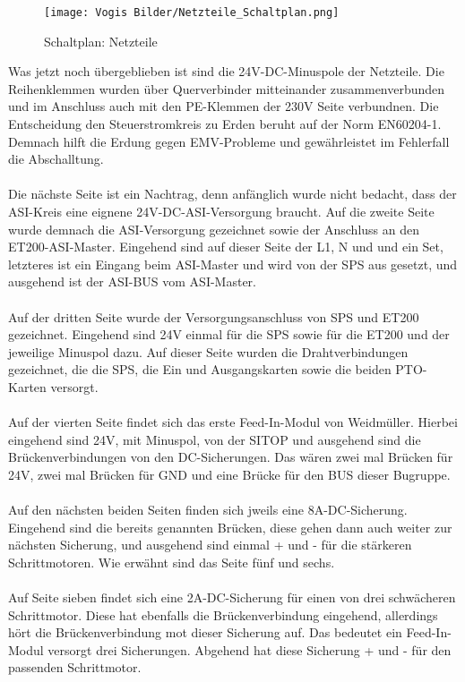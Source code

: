     \begin{figure}[h]
        \centering
        \texttt{[image: Vogis Bilder/Netzteile\_Schaltplan.png]}
        \caption{Schaltplan: Netzteile}
        \label{fig:Netzteile}
    \end{figure}Was jetzt noch übergeblieben ist sind die 24V-DC-Minuspole der Netzteile. Die Reihenklemmen wurden über Querverbinder mitteinander zusammenverbunden und im Anschluss auch mit den PE-Klemmen der 230V Seite verbundnen. Die Entscheidung den Steuerstromkreis zu Erden beruht auf der Norm EN60204-1. Demnach hilft die Erdung gegen EMV-Probleme und gewährleistet im Fehlerfall die Abschalltung. \cite{elektronet_steuerstromkreis_geerdet}\cite{beckhoff_steuerstromkreis_geerdet}\\\\
    Die nächste Seite ist ein Nachtrag, denn anfänglich wurde nicht bedacht, dass der ASI-Kreis eine eignene 24V-DC-ASI-Versorgung braucht. Auf die zweite Seite wurde demnach die ASI-Versorgung gezeichnet sowie der Anschluss an den ET200-ASI-Master. Eingehend sind auf dieser Seite der L1, N und und ein Set, letzteres ist ein Eingang beim ASI-Master und wird von der SPS aus gesetzt, und ausgehend ist der ASI-BUS vom ASI-Master.\\\\
    Auf der dritten Seite wurde der Versorgungsanschluss von SPS und ET200 gezeichnet. Eingehend sind 24V einmal für die SPS sowie für die ET200 und der jeweilige Minuspol dazu. Auf dieser Seite wurden die Drahtverbindungen gezeichnet, die die SPS, die Ein und Ausgangskarten sowie die beiden PTO-Karten versorgt.\\\\
    Auf der vierten Seite findet sich das erste Feed-In-Modul von Weidmüller. Hierbei eingehend sind 24V, mit Minuspol, von der SITOP und ausgehend sind die Brückenverbindungen von den DC-Sicherungen. Das wären zwei mal Brücken für 24V, zwei mal Brücken für GND und eine Brücke für den BUS dieser Bugruppe.\\\\
    Auf den nächsten beiden Seiten finden sich jweils eine 8A-DC-Sicherung. Eingehend sind die bereits genannten Brücken, diese gehen dann auch weiter zur nächsten Sicherung, und ausgehend sind einmal + und - für die stärkeren Schrittmotoren. Wie erwähnt sind das Seite fünf und sechs.\\\\
    Auf Seite sieben findet sich eine 2A-DC-Sicherung für einen von drei schwächeren Schrittmotor. Diese hat ebenfalls die Brückenverbindung eingehend, allerdings hört die Brückenverbindung mot dieser Sicherung auf. Das bedeutet ein Feed-In-Modul versorgt drei Sicherungen. Abgehend hat diese Sicherung + und - für den passenden Schrittmotor.\\\\

